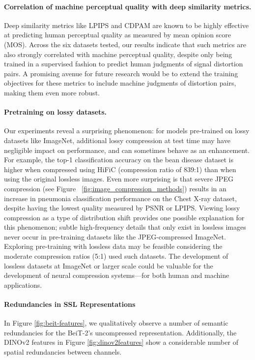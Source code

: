 \documentclass[10pt,twocolumn,letterpaper]{article}
\begin{document}
\paragraph{Correlation of machine perceptual quality with deep similarity metrics.} Deep similarity metrics like LPIPS and CDPAM are known to be highly effective at predicting human perceptual quality as measured by mean opinion score (MOS). Across the six datasets tested, our results indicate that such metrics are also strongly correlated with machine perceptual quality, despite only being trained in a supervised fashion to predict human judgments of signal distortion pairs. A promising avenue for future research would be to extend the training objectives for these metrics to include machine judgments of distortion pairs, making them even more robust.

\paragraph{Pretraining on lossy datasets.} Our experiments reveal a surprising phenomenon: for models pre-trained on lossy datasets like ImageNet, additional lossy compression at test time may have negligible impact on performance, and can sometimes behave as an enhancement. For example, the top-1 classification accuracy on the bean disease dataset is higher when compressed using HiFiC (compression ratio of 839:1) than when using the original lossless images. Even more surprising is that severe JPEG compression (see Figure ~\ref{fig:image_compression_methods}) results in an increase in pneumonia classification performance on the Chest X-ray dataset, despite having the lowest quality measured by PSNR or LPIPS. Viewing lossy compression as a type of distribution shift provides one possible explanation for this phenomenon; subtle high-frequency details that only exist in lossless images never occur in pre-training datasets like the JPEG-compressed ImageNet. Exploring pre-training with lossless data may be feasible considering the moderate compression ratios (5:1) used such datasets. The development of lossless datasets at ImageNet or larger scale could be valuable for the development of neural compression systems---for both human and machine applications.  

\paragraph{Redundancies in SSL Representations}

In Figure \ref{fig:beit-features}, we qualitatively observe a number of semantic redundancies for the BeiT-2's uncompressed representation. Additionally, the DINOv2 features in Figure \ref{fig:dinov2features} show a considerable number of spatial redundancies between channels.
\end{document}
